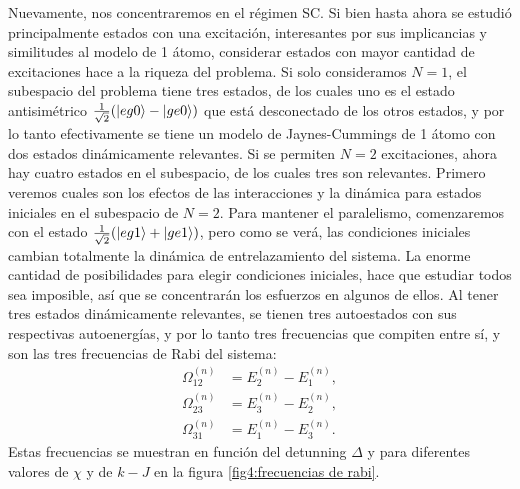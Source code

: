  Nuevamente, nos concentraremos en el régimen SC. Si bien hasta ahora se estudió principalmente estados con una excitación, interesantes por sus implicancias y similitudes al modelo de 1 átomo, considerar estados con mayor cantidad de excitaciones hace a la riqueza del problema. Si solo consideramos $N=1$, el subespacio del problema tiene tres estados, de los cuales uno es el estado antisimétrico $\frac{1}{\sqrt{2}}(\ket{eg0}-\ket{ge0})$ que está desconectado de los otros estados, y por lo tanto efectivamente se tiene un modelo de Jaynes-Cummings de 1 átomo con dos estados dinámicamente relevantes. Si se permiten $N=2$ excitaciones, ahora hay cuatro estados en el subespacio, de los cuales tres son relevantes. Primero veremos cuales son los efectos de las interacciones y la dinámica para estados iniciales en el subespacio de $N=2$. Para mantener el paralelismo, comenzaremos con el estado $\frac{1}{\sqrt{2}}(\ket{eg1}+\ket{ge1})$, pero como se verá, las condiciones iniciales cambian totalmente la dinámica de entrelazamiento del sistema. La enorme cantidad de posibilidades para elegir condiciones iniciales, hace que estudiar todos sea imposible, así que se  concentrarán los esfuerzos en algunos de ellos.
Al tener tres estados dinámicamente relevantes, se tienen tres autoestados con sus respectivas autoenergías, y por lo tanto tres frecuencias que compiten entre sí, y son las tres frecuencias de Rabi del sistema:
\begin{equation}
    \begin{aligned}
        \Omega^{(n)}_{12} &= E^{(n)}_2-E^{(n)}_1 ,\\
        \Omega^{(n)}_{23} &=E^{(n)}_3-E^{(n)}_2, \\
        \Omega^{(n)}_{31} &= E^{(n)}_1-E^{(n)}_3 .        
    \end{aligned}
    \label{ec4:frecuencias de rabi}
\end{equation}
Estas frecuencias se muestran en función del detunning $\Delta$ y para diferentes valores de $\chi$ y de $k-J$ en la figura \ref{fig4:frecuencias de rabi}.
